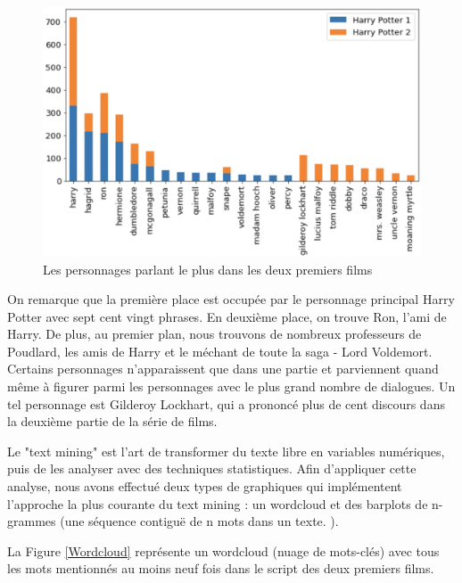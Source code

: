 \documentclass[11pt]{article}
\begin{document}
\begin{center}
\begin{figure}[hbt!]
    \centering
    \includegraphics[width= 13cm, height= 8 cm]{./figures/most.png}
    \caption{Les personnages parlant le plus dans les deux premiers films}
    \label{PersoPopuaire}
\end{figure}
\FloatBarrier

On remarque que la première place est occupée par le personnage principal Harry Potter avec sept cent vingt phrases. En deuxième place, on trouve Ron, l'ami de Harry. De plus, au premier plan, nous trouvons de nombreux professeurs de Poudlard, les amis de Harry et le méchant de toute la saga - Lord Voldemort. Certains personnages n'apparaissent que dans une partie et parviennent quand même à figurer parmi les personnages avec le plus grand nombre de dialogues. Un tel personnage est Gilderoy Lockhart, qui a prononcé plus de cent discours dans la deuxième partie de la série de films.\par

Le "text mining" est l'art de transformer du texte libre en variables numériques, puis de les analyser avec des techniques statistiques. Afin d'appliquer cette analyse, nous avons effectué deux types de graphiques qui implémentent l'approche la plus courante du text mining : un wordcloud et des barplots de n-grammes (une séquence contiguë de n mots dans un texte. ).\par

La Figure \ref{Wordcloud} représente un wordcloud (nuage de mots-clés) avec tous les mots mentionnés au moins neuf fois dans le script des deux premiers films.


\end{center}
\end{document}
